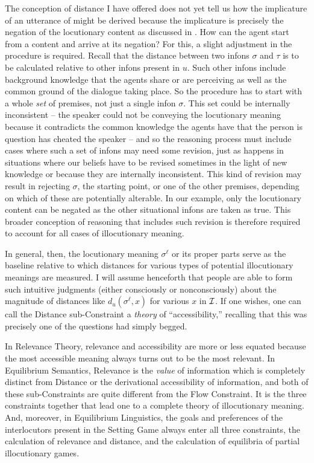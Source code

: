 The conception of distance I have offered does not yet tell us how the implicature of an utterance of  might be derived because the implicature is precisely the negation of the locutionary content as discussed in . How can the agent start from a content and arrive at its negation? For this, a slight adjustment in the procedure is required. Recall that the distance between two infons $\sigma$ and $\tau$ is to be calculated relative to other infons present in $u$. Such other infons include background knowledge that the agents share or are perceiving as well as the common ground of the dialogue taking place. So the procedure has to start with a whole \emph{set} of premises, not just a single infon $\sigma$. This set could be internally inconsistent -- the speaker could not be conveying the locutionary meaning because it contradicts the common knowledge the agents have that the person is question has cheated the speaker -- and so the reasoning process must include cases where such a set of infons may need some revision, just as happens in situations where our beliefs have to be revised sometimes in the light of new knowledge or because they are internally inconsistent. This kind of revision may result in rejecting $\sigma$, the starting point, or one of the other premises, depending on which of these are potentially alterable. In our example, only the locutionary content can be negated as the other situational infons are taken as true. This broader conception of reasoning that includes such revision is therefore required to account for all cases of illocutionary meaning.

In general, then, the locutionary meaning $\sigma^\ell$ or its proper parts serve as the baseline relative to which distances for various types of potential illocutionary meanings are measured. I will assume henceforth that people are able to form such intuitive judgments (either consciously or nonconsciously) about the magnitude of distances like $d_u(\sigma^\ell, x)$ for various $x$ in $\cal I$. If one wishes, one can call the Distance sub-Constraint a \emph{theory} of ``accessibility,'' recalling that this was precisely one of the questions  had simply begged. 


In Relevance Theory, relevance and accessibility are more or less equated because the most accessible meaning always turns out to be the most relevant. In Equilibrium Semantics, Relevance is the \emph{value} of information which is completely distinct from Distance or the derivational accessibility of information, and both of these sub-Constraints are quite different from the Flow Constraint. It is the three constraints together that lead one to a complete theory of illocutionary meaning. And, moreover, in Equilibrium Linguistics, the goals and preferences of the interlocutors present in the Setting Game always enter all three constraints, the calculation of relevance and distance, and the calculation of equilibria of partial illocutionary games.

